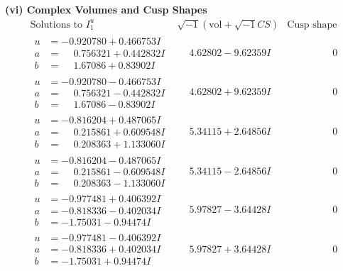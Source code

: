 \documentclass[1p]{elsarticle_modified}
\theoremstyle{definition}
\newcommand{\I}{\sqrt{-1}}
\begin{document}
\newpage\flushleft \textbf{(vi) Complex Volumes and Cusp Shapes}
$$\begin{array}{c|c|c}  
\text{Solutions to }I^u_{1}& \I (\text{vol} + \sqrt{-1}CS) & \text{Cusp shape}\\
 \hline 
\begin{aligned}
u &= -0.920780 + 0.466753 I \\
a &= \phantom{-}0.756321 + 0.442832 I \\
b &= \phantom{-}1.67086 + 0.83902 I\end{aligned}
 & \phantom{-}4.62802 - 9.62359 I & \phantom{-0.000000 } 0 \\ \hline\begin{aligned}
u &= -0.920780 - 0.466753 I \\
a &= \phantom{-}0.756321 - 0.442832 I \\
b &= \phantom{-}1.67086 - 0.83902 I\end{aligned}
 & \phantom{-}4.62802 + 9.62359 I & \phantom{-0.000000 } 0 \\ \hline\begin{aligned}
u &= -0.816204 + 0.487065 I \\
a &= \phantom{-}0.215861 + 0.609548 I \\
b &= \phantom{-}0.208363 + 1.133060 I\end{aligned}
 & \phantom{-}5.34115 + 2.64856 I & \phantom{-0.000000 } 0 \\ \hline\begin{aligned}
u &= -0.816204 - 0.487065 I \\
a &= \phantom{-}0.215861 - 0.609548 I \\
b &= \phantom{-}0.208363 - 1.133060 I\end{aligned}
 & \phantom{-}5.34115 - 2.64856 I & \phantom{-0.000000 } 0 \\ \hline\begin{aligned}
u &= -0.977481 + 0.406392 I \\
a &= -0.818336 - 0.402034 I \\
b &= -1.75031 - 0.94474 I\end{aligned}
 & \phantom{-}5.97827 - 3.64428 I & \phantom{-0.000000 } 0 \\ \hline\begin{aligned}
u &= -0.977481 - 0.406392 I \\
a &= -0.818336 + 0.402034 I \\
b &= -1.75031 + 0.94474 I\end{aligned}
 & \phantom{-}5.97827 + 3.64428 I & \phantom{-0.000000 } 0 \\ \hline\begin{aligned}

\end{aligned}
\end{array}$$
\end{document}
